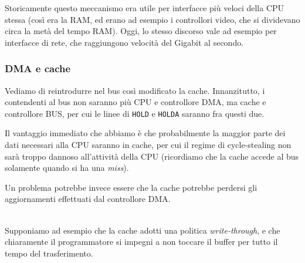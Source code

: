 \documentclass[a4paper,11pt]{article}
\begin{document}
Storicamente questo meccanismo era utile per interfacce più veloci della CPU stessa (così era la RAM, ed erano ad esempio i controllori video, che si dividevano circa la metà del tempo RAM).
Oggi, lo stesso discorso vale ad esempio per interfacce di rete, che raggiungono velocità del Gigabit al secondo.

\subsubsection{DMA e cache}
Vediamo di reintrodurre nel bus così modificato la cache.
Innanzitutto, i contendenti al bus non saranno più CPU e controllore DMA, ma cache e controllore BUS, per cui le linee di \lstinline|HOLD| e \lstinline|HOLDA| saranno fra questi due.

Il vantaggio immediato che abbiamo è che probabilmente la maggior parte dei dati necessari alla CPU saranno in cache, per cui il regime di cycle-stealing non sarà troppo dannoso all'attività della CPU (ricordiamo che la cache accede al bus solamente quando si ha una \textit{miss}).

Un problema potrebbe invece essere che la cache potrebbe perdersi gli aggiornamenti effettuati dal controllore DMA.

\par\smallskip
\noindent
\textbf{} \\
Supponiamo ad esempio che la cache adotti una politica \textit{write-through}, e che chiaramente il programmatore si impegni a non toccare il buffer per tutto il tempo del trasferimento.
\end{document}
